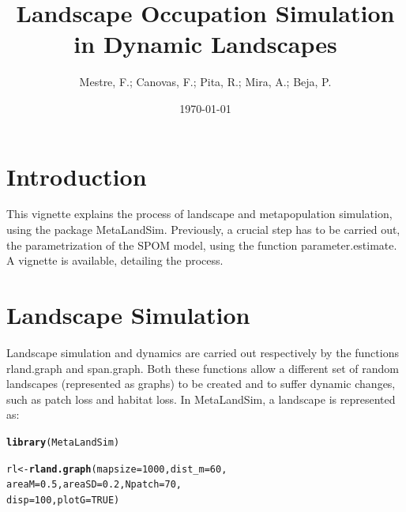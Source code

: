 \documentclass{article}\usepackage[]{graphicx}\usepackage[]{xcolor}
\title{Landscape Occupation Simulation in Dynamic Landscapes}
\author{Mestre, F.; Canovas, F.; Pita, R.; Mira, A.; Beja, P.}
\date{\today}
\makeatletter
\newcommand{\hlnum}[1]{\textcolor[rgb]{0.686,0.059,0.569}{#1}}%
\newcommand{\hldef}[1]{\textcolor[rgb]{0.345,0.345,0.345}{#1}}%
\newcommand{\hlkwb}[1]{\textcolor[rgb]{0.69,0.353,0.396}{#1}}%
\newcommand{\hlkwc}[1]{\textcolor[rgb]{0.333,0.667,0.333}{#1}}%
\newcommand{\hlkwd}[1]{\textcolor[rgb]{0.737,0.353,0.396}{\textbf{#1}}}%
\newenvironment{kframe}{%
 \def\at@end@of@kframe{}%
 \ifinner\ifhmode%
  \def\at@end@of@kframe{\end{minipage}}%
  \begin{minipage}{\columnwidth}%
 \fi\fi%
 \def\FrameCommand##1{\hskip\@totalleftmargin \hskip-\fboxsep
 \colorbox{shadecolor}{##1}\hskip-\fboxsep
     \hskip-\linewidth \hskip-\@totalleftmargin \hskip\columnwidth}%
 \MakeFramed {\advance\hsize-\width
   \@totalleftmargin\z@ \linewidth\hsize
   \@setminipage}}%
 {\par\unskip\endMakeFramed%
 \at@end@of@kframe}
\newenvironment{knitrout}{}{} %
\makeatother
\begin{document}
\maketitle

\section{Introduction}
This vignette explains the process of landscape and metapopulation simulation, using the package MetaLandSim. Previously, a crucial step has to be carried out, the parametrization of the SPOM model, using the function parameter.estimate. A vignette is available, detailing the process.


\section{Landscape Simulation}
Landscape simulation and dynamics are carried out respectively by the functions rland.graph and span.graph. Both these functions allow a different set of random landscapes (represented as graphs) to be created and to suffer dynamic changes, such as patch loss and habitat loss. In MetaLandSim, a landscape is represented as:
\begin{knitrout}
\color{fgcolor}\begin{kframe}
\begin{alltt}
\hlkwd{library}\hldef{(MetaLandSim)}
\end{alltt}


{\ttfamily\noindent\bfseries\color{errorcolor}{\#\# Error in library(MetaLandSim): there is no package called 'MetaLandSim'}}\begin{alltt}
\hldef{rl} \hlkwb{<-} \hlkwd{rland.graph}\hldef{(}\hlkwc{mapsize} \hldef{=} \hlnum{1000}\hldef{,} \hlkwc{dist_m} \hldef{=} \hlnum{60}\hldef{,}
                  \hlkwc{areaM} \hldef{=} \hlnum{0.5}\hldef{,} \hlkwc{areaSD} \hldef{=} \hlnum{0.2}\hldef{,} \hlkwc{Npatch} \hldef{=}\hlnum{70}\hldef{,}
                  \hlkwc{disp} \hldef{=} \hlnum{100}\hldef{,} \hlkwc{plotG} \hldef{=} \hlnum{TRUE}\hldef{)}
\end{alltt}


{\ttfamily\noindent\bfseries{}}\end{kframe}
\end{knitrout}
\end{document}
